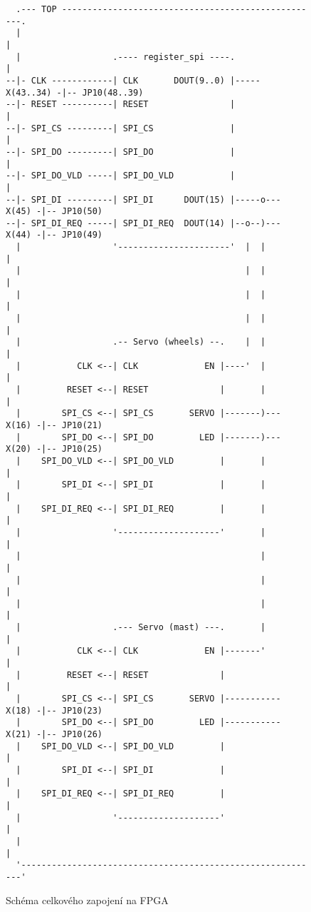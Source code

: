 \begin{figure}[h]
\label{fig:fpga_top}
\caption{Schéma celkového zapojení na FPGA}
\centering
\begin{Verbatim}
  .--- TOP ---------------------------------------------------.
  |                                                           |
  |                  .---- register_spi ----.                 |
--|- CLK ------------| CLK       DOUT(9..0) |----- X(43..34) -|-- JP10(48..39)
--|- RESET ----------| RESET                |                 |
--|- SPI_CS ---------| SPI_CS               |                 |
--|- SPI_DO ---------| SPI_DO               |                 |
--|- SPI_DO_VLD -----| SPI_DO_VLD           |                 |
--|- SPI_DI ---------| SPI_DI      DOUT(15) |-----o--- X(45) -|-- JP10(50)
--|- SPI_DI_REQ -----| SPI_DI_REQ  DOUT(14) |--o--)--- X(44) -|-- JP10(49)
  |                  '----------------------'  |  |           |
  |                                            |  |           |
  |                                            |  |           |
  |                                            |  |           |
  |                  .-- Servo (wheels) --.    |  |           |
  |           CLK <--| CLK             EN |----'  |           |
  |         RESET <--| RESET              |       |           |
  |        SPI_CS <--| SPI_CS       SERVO |-------)--- X(16) -|-- JP10(21)
  |        SPI_DO <--| SPI_DO         LED |-------)--- X(20) -|-- JP10(25)
  |    SPI_DO_VLD <--| SPI_DO_VLD         |       |           |
  |        SPI_DI <--| SPI_DI             |       |           |
  |    SPI_DI_REQ <--| SPI_DI_REQ         |       |           |
  |                  '--------------------'       |           |
  |                                               |           |
  |                                               |           |
  |                                               |           |
  |                  .--- Servo (mast) ---.       |           |
  |           CLK <--| CLK             EN |-------'           |
  |         RESET <--| RESET              |                   |
  |        SPI_CS <--| SPI_CS       SERVO |----------- X(18) -|-- JP10(23)
  |        SPI_DO <--| SPI_DO         LED |----------- X(21) -|-- JP10(26)
  |    SPI_DO_VLD <--| SPI_DO_VLD         |                   |
  |        SPI_DI <--| SPI_DI             |                   |
  |    SPI_DI_REQ <--| SPI_DI_REQ         |                   |
  |                  '--------------------'                   |
  |                                                           |
  '-----------------------------------------------------------'
\end{Verbatim}
\end{figure}

